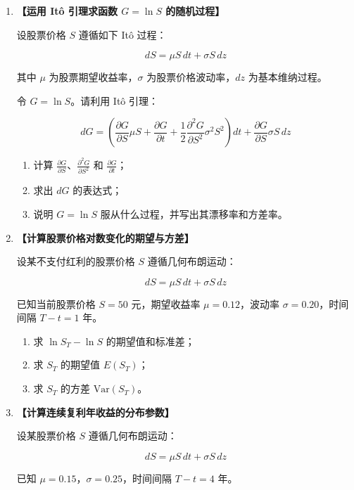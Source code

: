 \documentclass{article}
\begin{document}
\begin{enumerate}[label=\textbf{\arabic*.}]
\item  {\bf{【运用 Itô 引理求函数 \(G = \ln S\) 的随机过程】}} %

设股票价格 \(S\) 遵循如下 Itô 过程：

\[
dS = \mu S \, dt + \sigma S \, dz
\]

其中 \(\mu\) 为股票期望收益率，\(\sigma\) 为股票价格波动率，\(dz\) 为基本维纳过程。

令 \(G = \ln S\)。请利用 Itô 引理：

\[
dG = \left( \frac{\partial G}{\partial S} \mu S + \frac{\partial G}{\partial t} + \frac{1}{2} \frac{\partial^2 G}{\partial S^2} \sigma^2 S^2 \right) dt + \frac{\partial G}{\partial S} \sigma S \, dz
\]

\begin{enumerate}[label=(\arabic*)]
    \item 计算 \(\frac{\partial G}{\partial S}\)、\(\frac{\partial^2 G}{\partial S^2}\) 和 \(\frac{\partial G}{\partial t}\)；
    \item 求出 \(dG\) 的表达式；
    \item 说明 \(G = \ln S\) 服从什么过程，并写出其漂移率和方差率。
\end{enumerate}



\item  {\bf{【计算股票价格对数变化的期望与方差】}} %

设某不支付红利的股票价格 \(S\) 遵循几何布朗运动：

\[
dS = \mu S \, dt + \sigma S \, dz
\]

已知当前股票价格 \(S = 50\) 元，期望收益率 \(\mu = 0.12\)，波动率 \(\sigma = 0.20\)，时间间隔 \(T - t = 1\) 年。

\begin{enumerate}[label=(\arabic*)]
    \item 求 \(\ln S_T - \ln S\) 的期望值和标准差；
    \item 求 \(S_T\) 的期望值 \(E(S_T)\)；
    \item 求 \(S_T\) 的方差 \(\text{Var}(S_T)\)。
\end{enumerate}



\item  {\bf{【计算连续复利年收益的分布参数】}} %

设某股票价格 \(S\) 遵循几何布朗运动：

\[
dS = \mu S \, dt + \sigma S \, dz
\]

已知 \(\mu = 0.15\)，\(\sigma = 0.25\)，时间间隔 \(T - t = 4\) 年。


\end{enumerate}
\end{document}
